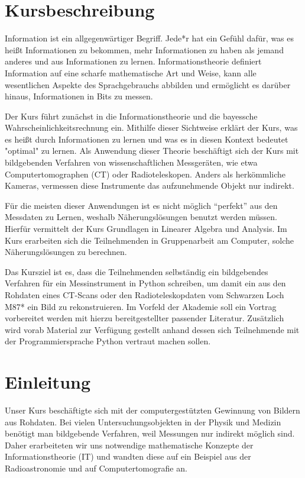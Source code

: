 \section*{Kursbeschreibung}
Information ist ein allgegenwärtiger Begriff. Jede*r hat ein Gefühl dafür, was es heißt Informationen zu bekommen, mehr Informationen zu haben als jemand anderes und aus Informationen zu lernen.
Informationstheorie definiert Information auf eine scharfe mathematische Art und Weise, kann alle wesentlichen Aspekte des Sprachgebrauchs abbilden und ermöglicht es darüber hinaus, Informationen in Bits zu messen.

Der Kurs führt zunächst in die Informationstheorie und die bayessche Wahrscheinlichkeitsrechnung ein.
Mithilfe dieser Sichtweise erklärt der Kurs, was es heißt durch Informationen zu lernen und was es in diesen Kontext bedeutet "optimal" zu lernen.
Als Anwendung dieser Theorie beschäftigt sich der Kurs mit bildgebenden Verfahren von wissenschaftlichen Messgeräten, wie etwa Computertomographen (CT) oder Radioteleskopen.
Anders als herkömmliche Kameras, vermessen diese Instrumente das aufzunehmende Objekt nur indirekt.

Für die meisten dieser Anwendungen ist es nicht möglich \enquote{perfekt} aus den Messdaten zu Lernen, weshalb Näherungslösungen benutzt werden müssen.
Hierfür vermittelt der Kurs Grundlagen in Linearer Algebra und Analysis.
Im Kurs erarbeiten sich die Teilnehmenden in Gruppenarbeit am Computer, solche Näherungslösungen zu berechnen.

Das Kursziel ist es, dass die Teilnehmenden selbständig ein bildgebendes Verfahren für ein Messinstrument in Python schreiben, um damit ein aus den Rohdaten eines CT-Scans oder den Radioteleskopdaten vom Schwarzen Loch M87* ein Bild zu rekonstruieren.
Im Vorfeld der Akademie soll ein Vortrag vorbereitet werden mit hierzu bereitgestellter passender Literatur.
Zusätzlich wird vorab Material zur Verfügung gestellt anhand dessen sich Teilnehmende mit der Programmiersprache Python vertraut machen sollen.

\section{Einleitung}

Unser Kurs beschäftigte sich mit der computergestützten Gewinnung von Bildern aus Rohdaten.
Bei vielen Untersuchungsobjekten in der Physik und Medizin benötigt man bildgebende Verfahren, weil Messungen nur indirekt möglich sind.
Daher erarbeiteten wir uns notwendige mathematische Konzepte der Informationstheorie (IT) und wandten diese auf ein Beispiel aus der Radioastronomie und auf Computertomografie an.

